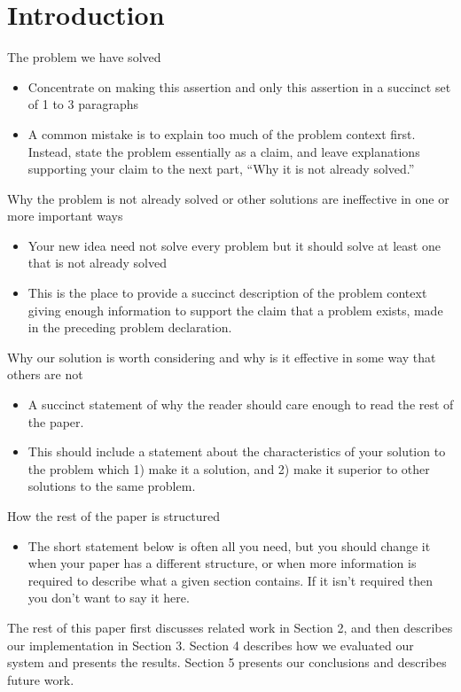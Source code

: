 \section{Introduction}

The problem we have solved
\begin{itemize}
    \item Concentrate on making this assertion and only this assertion in a succinct set of 1 to 3 paragraphs
    \item A common mistake is to explain too much of the problem context first. Instead, state the problem essentially as a claim, and leave explanations supporting your claim to the next part, “Why it is not already solved.”
\end{itemize}

Why the problem is not already solved or other solutions are ineffective in one or more important ways
\begin{itemize}

\item Your new idea need not solve every problem but it should solve at least one that is not already solved
\item This is the place to provide a succinct description of the problem context giving enough information to support the claim that a problem exists, made in the preceding problem declaration.
  
\end{itemize}

Why our solution is worth considering and why is it effective in some way that others are not

\begin{itemize}
\item A succinct statement of why the reader should care enough to read the rest of the paper.
\item This should include a statement about the characteristics of your solution to the problem which 1) make it a solution, and 2) make it superior to other solutions to the same problem.
\end{itemize}

How the rest of the paper is structured
\begin{itemize}
    \item The short statement below is often all you need, but you should change it when your paper has a different structure, or when more information is required to describe what a given section contains. If it isn’t required then you don’t want to say it here.
\end{itemize}

The rest of this paper first discusses related work in Section 2, and then describes our implementation in Section 3. Section 4 describes how we evaluated our system and presents the results. Section 5 presents our conclusions and describes future work.